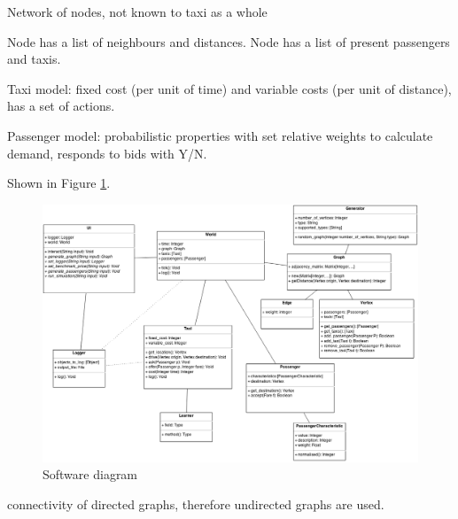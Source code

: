 Network of nodes, not known to taxi as a whole

Node has a list of neighbours and distances.
Node has a list of present passengers and taxis.

Taxi model: fixed cost (per unit of time) and variable costs (per unit of
distance), has a set of actions.

Passenger model: probabilistic properties with set relative weights to
calculate demand, responds to bids with Y/N.

Shown in Figure \ref{figure:design:software}.

\begin{figure}
  \begin{center}
    \includegraphics[width=\textwidth]{../figures/software_diagram}
    \caption{
      Software diagram
      \label{figure:design:software}
    }
  \end{center}
\end{figure}

connectivity of directed graphs, therefore undirected graphs are
used.
